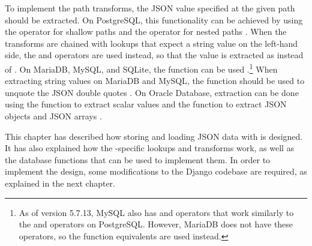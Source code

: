 To implement the path transforms, the JSON value specified at the given path
should be extracted. On PostgreSQL, this functionality can be achieved by using
the \code{->} operator for shallow paths and the \code{\#>} operator for nested
paths \cite{postgres:json_operators}. When the transforms are chained with
lookups that expect a string value on the left-hand side, the \code{->>} and
\code{\#>>} operators are used instead, so that the value is extracted as
 instead of . On MariaDB, MySQL, and SQLite, the
 function can be used \cite{mariadb:json_extract,
mysql:json_search, sqlite:json1}.\footnote{As of version 5.7.13, MySQL also has
\code{->} and \code{->>} operators that work similarly to the \code{\#>} and
\code{\#>>} operators on PostgreSQL. However, MariaDB does not have these
operators, so the function equivalents are used instead.} When extracting
string values on MariaDB and MySQL, the  function should be
used to unquote the JSON double quotes \cite{mariadb:json_unquote,
mysql:json_modify}. On Oracle Database, extraction can be done using the
 function to extract scalar values and the 
function to extract JSON objects and JSON arrays \cite{oracle:json_value,
oracle:json_query}.

This chapter has described how storing and loading JSON data with
 is designed. It has also explained how the
-specific lookups and transforms work, as well as the database
functions that can be used to implement them. In order to implement the design,
some modifications to the Django codebase are required, as explained in the
next chapter.
